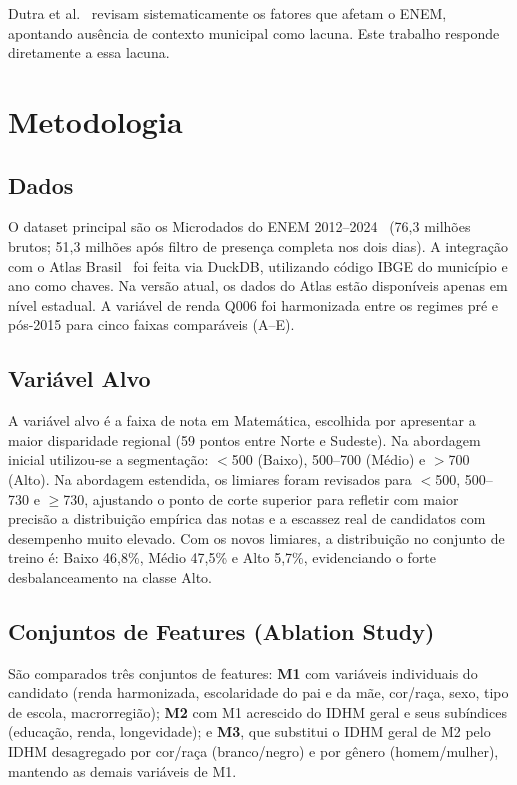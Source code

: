 \documentclass[12pt]{article}
\begin{document}
Dutra et al.~\cite{dutra2023fatores} revisam sistematicamente os fatores
que afetam o ENEM, apontando ausência de contexto municipal como lacuna.
Este trabalho responde diretamente a essa lacuna.

\section{Metodologia}

\subsection{Dados}

O dataset principal são os Microdados do ENEM 2012--2024~\cite{inep2024}
(76,3 milhões brutos; 51,3 milhões após filtro de presença completa nos
dois dias). A integração com o Atlas Brasil~\cite{pnud2017} foi feita via
DuckDB, utilizando código IBGE do município e ano como chaves. Na versão
atual, os dados do Atlas estão disponíveis apenas em nível estadual. A
variável de renda Q006 foi harmonizada entre os regimes pré e pós-2015
para cinco faixas comparáveis (A--E).

\subsection{Variável Alvo}

A variável alvo é a faixa de nota em Matemática, escolhida por apresentar
a maior disparidade regional (59 pontos entre Norte e Sudeste). Na
abordagem inicial utilizou-se a segmentação: $<$500 (Baixo), 500--700
(Médio) e $>$700 (Alto). Na abordagem estendida, os limiares foram
revisados para $<$500, 500--730 e $\geq$730, ajustando o ponto de corte
superior para refletir com maior precisão a distribuição empírica das
notas e a escassez real de candidatos com desempenho muito elevado.
Com os novos limiares, a distribuição no conjunto de treino é: Baixo
46,8\%, Médio 47,5\% e Alto 5,7\%, evidenciando o forte desbalanceamento
na classe Alto.

\subsection{Conjuntos de Features (Ablation Study)}

São comparados três conjuntos de features: \textbf{M1} com variáveis
individuais do candidato (renda harmonizada, escolaridade do pai e da
mãe, cor/raça, sexo, tipo de escola, macrorregião); \textbf{M2} com M1
acrescido do IDHM geral e seus subíndices (educação, renda, longevidade);
e \textbf{M3}, que substitui o IDHM geral de M2 pelo IDHM desagregado
por cor/raça (branco/negro) e por gênero (homem/mulher), mantendo as
demais variáveis de M1.
\end{document}

